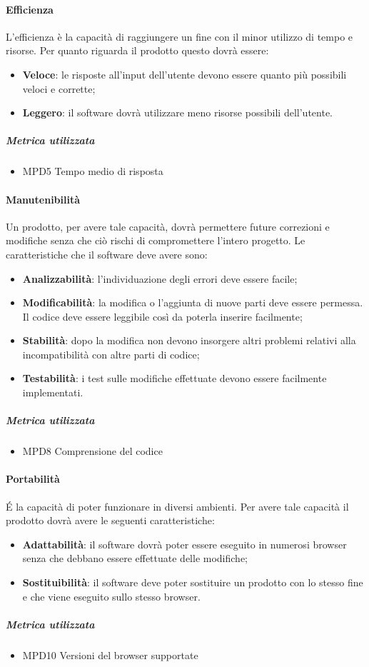 \paragraph{Efficienza}
L'efficienza è la capacità di raggiungere un fine con il minor utilizzo di tempo e risorse. Per quanto riguarda il prodotto questo dovrà essere:
\begin{itemize}
\item \textbf{Veloce}: le risposte all'input dell'utente devono essere quanto più possibili veloci e corrette;
\item \textbf{Leggero}: il software dovrà utilizzare meno risorse possibili dell'utente.
\end{itemize}
\subparagraph{Metrica utilizzata}
\begin{itemize}
\item MPD5 Tempo medio di risposta
\end{itemize}
\paragraph{Manutenibilità}
Un prodotto, per avere tale capacità, dovrà permettere future correzioni e modifiche senza che ciò rischi di compromettere l'intero progetto. Le caratteristiche che il software deve avere sono:
\begin{itemize}
\item \textbf{Analizzabilità}: l'individuazione degli errori deve essere facile;
\item \textbf{Modificabilità}: la modifica o l'aggiunta di nuove parti deve essere permessa. Il codice deve essere leggibile così da poterla inserire facilmente;
\item \textbf{Stabilità}: dopo la modifica non devono insorgere altri problemi relativi alla incompatibilità con altre parti di codice;
\item \textbf{Testabilità}: i test sulle modifiche effettuate devono essere facilmente implementati.
\end{itemize}
\subparagraph{Metrica utilizzata}
\begin{itemize}
\item MPD8 Comprensione del codice
\end{itemize}
\paragraph{Portabilità}
\'E la capacità di poter funzionare in diversi ambienti. Per avere tale capacità il prodotto dovrà avere le seguenti caratteristiche:
\begin{itemize}
\item \textbf{Adattabilità}: il software dovrà poter essere eseguito in numerosi browser senza che debbano essere effettuate delle modifiche;
\item \textbf{Sostituibilità}: il software deve poter sostituire un prodotto con lo stesso fine e che viene eseguito sullo stesso browser. 
\end{itemize}
\subparagraph{Metrica utilizzata}
\begin{itemize}
\item MPD10 Versioni del browser supportate
\end{itemize}

